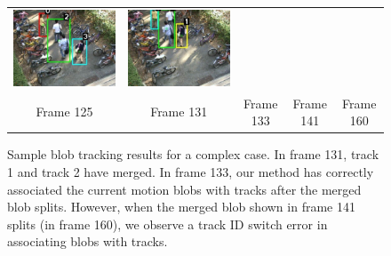 \begin{figure}[t]
\begin{center}
\begin{tabular}{ccccc}
      \includegraphics[scale=0.21]{figures/complex-tracking-result-0141.pdf} &
      \includegraphics[scale=0.21]{figures/complex-tracking-result-0160.pdf} 
      \\
      \small Frame 125 & 
      \small Frame 131 & 
      \small Frame 133 & 
      \small Frame 141 & 
      \small Frame 160
    \end{tabular}
  \end{center}
  \caption[Sample blob tracking results for a complex case.]{\small
    Sample blob tracking results for a complex case. In frame 131,
    track 1 and track 2 have merged. In frame 133, our method has
    correctly associated the current motion blobs with tracks after
    the merged blob splits. However, when the merged blob shown in
    frame 141 splits (in frame 160), we observe a track ID switch
    error in associating blobs with tracks.}
  \label{fig:complex-tracking-results}
\end{figure}

